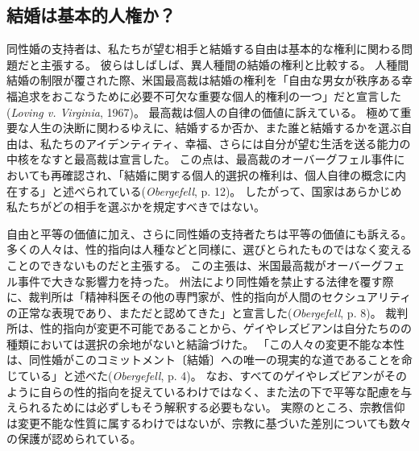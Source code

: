 \documentclass[paper=a4,book,openany]{jlreq}
\begin{document}
\subsection{結婚は基本的人権か？}

同性婚の支持者は、私たちが望む相手と結婚する自由は基本的な権利に関わる問題だと主張する。
彼らはしばしば、異人種間の結婚の権利と比較する。
人種間結婚の制限が覆された際、米国最高裁は結婚の権利を「自由な男女が秩序ある幸福追求をおこなうために必要不可欠な重要な個人的権利の一つ」だと宣言した(\emph{Loving v. Virginia}, 1967)。
最高裁は個人の自律の価値に訴えている。
極めて重要な人生の決断に関わるゆえに、結婚するか否か、また誰と結婚するかを選ぶ自由は、私たちのアイデンティティ、幸福、さらには自分が望む生活を送る能力の中核をなすと最高裁は宣言した。
この点は、最高裁のオーバーグフェル事件においても再確認され、「結婚に関する個人的選択の権利は、個人自律の概念に内在する」と述べられている(\emph{Obergefell}, p. 12)。
したがって、国家はあらかじめ私たちがどの相手を選ぶかを規定すべきではない。

自由と平等の価値に加え、さらに同性婚の支持者たちは平等の価値にも訴える。
多くの人々は、性的指向は人種などと同様に、選びとられたものではなく変えることのできないものだと主張する。
この主張は、米国最高裁がオーバーグフェル事件で大きな影響力を持った。
州法により同性婚を禁止する法律を覆す際に、裁判所は「精神科医その他の専門家が、性的指向が人間のセクシュアリティの正常な表現であり、まただと認めてきた」と宣言した(\emph{Obergefell}, p. 8)。
裁判所は、性的指向が変更不可能であることから、ゲイやレズビアンは自分たちのの種類においては選択の余地がないと結論づけた。
「この人々の変更不能な本性は、同性婚がこのコミットメント〔結婚〕への唯一の現実的な道であることを命じている」と述べた(\emph{Obergefell}, p. 4)。
なお、すべてのゲイやレズビアンがそのように自らの性的指向を捉えているわけではなく、また法の下で平等な配慮を与えられるためには必ずしもそう解釈する必要もない。
実際のところ、宗教信仰は変更不能な性質に属するわけではないが、宗教に基づいた差別についても数々の保護が認められている。
\end{document}
